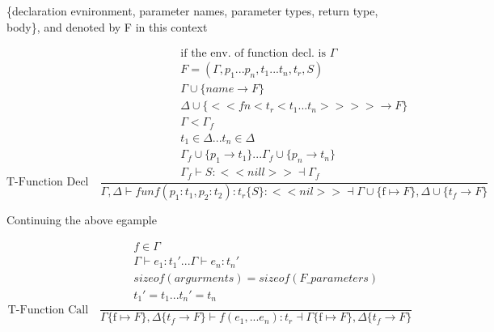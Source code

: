 \documentclass{article}
\begin{document}
{{\large {} \par}
{\large \{declaration evnironment, parameter names, parameter types, return type, body\}, and denoted by F in this context\par}


\[
\text{T-Function Decl} \quad
\frac{
  \begin{array}{c}
    \text{if the env. of function decl. is } \Gamma \\[1ex]
    F = (\Gamma, p_1...p_n,t_1...t_n,t_r,S) \\[1ex]
    \Gamma \cup \{name \rightarrow F\} \\[1ex]
    \Delta \cup \{<<fn<t_r<t_1...t_n>>>> \rightarrow F\} \\[1ex]
    \Gamma < \Gamma_f \\[1ex]
    t_1 \in \Delta ...t_n \in \Delta \\[1ex]
    \Gamma_f \cup \{p_1 \rightarrow t_1\}...\Gamma_f \cup\{p_n \rightarrow t_n\} \\[1ex]
    \Gamma_f \vdash S : <<nill>> \dashv \Gamma_f
    
  \end{array}
}{
  \Gamma, \Delta \vdash fun f(p_1:t_1,p_2:t_2): t_r \{S\}: <<nil>> \dashv \Gamma \cup \{\text{f} \mapsto F\}, \Delta \cup \{t_f \rightarrow F\}
}
\]

{\large Continuing the above egample \par}

\[
\text{T-Function Call} \quad
\frac{
  \begin{array}{c}
    f \in \Gamma \\[1ex]
    \Gamma \vdash e_1 : t_1'...\Gamma \vdash e_n : t_n' \\[1ex]
    sizeof(argurments) = sizeof(F\_parameters) \\[1ex]
    t_1' = t_1 ... t_n' = t_n \\[1ex]
    
  \end{array}
}{
  \Gamma \{\text{f} \mapsto F\}, \Delta \{t_f \rightarrow F\} \vdash f(e_1, ... e_n) : t_r \dashv \Gamma \{\text{f} \mapsto F\}, \Delta \{t_f \rightarrow F\}
}
\]


}
\end{document}
